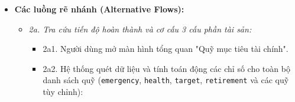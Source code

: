 \documentclass[11pt,a4paper]{article}
\providecommand{\tightlist}{
  \setlength{\itemsep}{0pt}\setlength{\parskip}{0pt}}
\begin{document}
\begin{itemize}
\begin{enumerate}
    \begin{itemize}
    \tightlist
    \item
      Kiểm tra tiền mặt: \(cashAmount \le UnallocatedCash\).
    \item
      Kiểm tra tài sản liên kết: Bảo đảm các sổ tiết kiệm và CCQ được
      chọn không bị liên kết trùng lặp theo quy tắc \texttt{BR-FIN-08}.
    \end{itemize}
  \item
    Hệ thống cập nhật bảng \texttt{funds\_cash}, lưu trường
    \texttt{cashAmount} cho quỹ tương ứng.
  \item
    Hệ thống cập nhật trường \texttt{fund\ =\ fundCode} cho các bản ghi
    sổ tiết kiệm trong bảng \texttt{savings} và các bản ghi CCQ trong
    bảng \texttt{fund\_certs}.
  \item
    Hệ thống tính toán lại tổng tài sản tích lũy thực tế
    \(Total_{fund}\) và tỷ lệ tiến độ \(Process\) theo quy tắc
    \texttt{BR-FIN-08}:
    \[Total_{fund} = Cash_{fund} + \sum_{s \in Savings_{fund}} Balance_s + \sum_{c \in FundCerts_{fund}} Balance_c\]
    \[Process = \frac{Total_{fund}}{targetAmount} \times 100\%\]
  \item
    Hệ thống thông báo phân bổ tài sản thành công, cập nhật giao diện
    tổng quan các quỹ mục tiêu kèm thanh tiến độ trực quan.
  \end{enumerate}
\item
  \textbf{Các luồng rẽ nhánh (Alternative Flows):}

  \begin{itemize}
  \tightlist
  \item
    \emph{2a. Tra cứu tiến độ hoàn thành và cơ cấu 3 cấu phần tài sản:}

    \begin{itemize}
    \tightlist
    \item
      2a1. Người dùng mở màn hình tổng quan "Quỹ mục tiêu tài chính".
    \item
      2a2. Hệ thống quét dữ liệu và tính toán động các chỉ số cho toàn
      bộ danh sách quỹ (\texttt{emergency}, \texttt{health},
      \texttt{target}, \texttt{retirement} và các quỹ tùy chỉnh):


\end{itemize}
\end{itemize}
\end{itemize}
\end{document}
